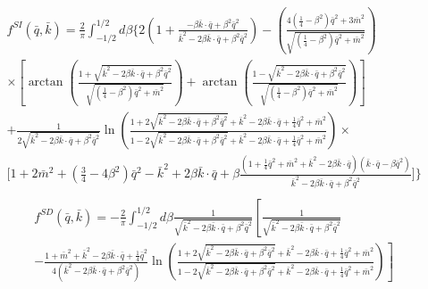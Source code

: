 \documentclass[12pt,letterpaper]{book}
\begin{document}
\begin{equation}
\begin{split}
&f^{SI}(\bar{q},\bar{k})=\frac{2}{\pi}\int_{-1/2}^{1/2}d\beta\Bigg\{2\left(1+\frac{-\beta\bar{k}\cdot\bar{q}+\beta^2\bar{q}^2}{\bar{k}^2-2\beta\bar{k}\cdot\bar{q}+\beta^2\bar{q}^2}\right)-\left(\frac{4(\frac{1}{4}-\beta^2)\bar{q}^2+3\bar{m}^2}{\sqrt{(\frac{1}{4}-\beta^2)\bar{q}^2+\bar{m}^2}}\right)\\
&\times\left[\arctan\left(\frac{1+\sqrt{\bar{k}^2-2\beta\bar{k}\cdot\bar{q}+\beta^2\bar{q}^2}}{\sqrt{(\frac{1}{4}-\beta^2)\bar{q}^2+\bar{m}^2}}\right)+\arctan\left(\frac{1-\sqrt{\bar{k}^2-2\beta\bar{k}\cdot\bar{q}+\beta^2\bar{q}^2}}{\sqrt{(\frac{1}{4}-\beta^2)\bar{q}^2+\bar{m}^2}}\right)\right]\\
&+\frac{1}{2\sqrt{\bar{k}^2-2\beta\bar{k}\cdot\bar{q}+\beta^2\bar{q}^2}}\ln\left(\frac{1+2\sqrt{\bar{k}^2-2\beta\bar{k}\cdot\bar{q}+\beta^2\bar{q}^2}+\bar{k}^2-2\beta\bar{k}\cdot\bar{q}+\frac{1}{4}\bar{q}^2+\bar{m}^2}{1-2\sqrt{\bar{k}^2-2\beta\bar{k}\cdot\bar{q}+\beta^2\bar{q}^2}+\bar{k}^2-2\beta\bar{k}\cdot\bar{q}+\frac{1}{4}\bar{q}^2+\bar{m}^2}\right)\times\\
&\Bigg[1+2\bar{m}^2+\left(\frac{3}{4}-4\beta^2\right)\bar{q}^2-\bar{k}^2+2\beta\bar{k}\cdot\bar{q}+\beta\frac{\left(1+\frac{1}{4}\bar{q}^2+\bar{m}^2+\bar{k}^2-2\beta\bar{k}\cdot\bar{q}\right)\left(\bar{k}\cdot\bar{q}-\beta\bar{q}^2\right)}{\bar{k}^2-2\beta\bar{k}\cdot\bar{q}+\beta^2\bar{q}^2}\Bigg]\Bigg\}\\
\end{split}
\end{equation}
\begin{equation}
\begin{split}
&f^{SD}(\bar{q},\bar{k})=-\frac{2}{\pi}\int_{-1/2}^{1/2}d\beta\frac{1}{\sqrt{\bar{k}^2-2\beta\bar{k}\cdot\bar{q}+\beta^2\bar{q}^2}}\left[\frac{1}{\sqrt{\bar{k}^2-2\beta\bar{k}\cdot\bar{q}+\beta^2\bar{q}^2}}\right.\\
&\left.-\frac{1+\bar{m}^2+\bar{k}^2-2\beta\bar{k}\cdot\bar{q}+\frac{1}{4}\bar{q}^2}{4\left(\bar{k}^2-2\beta\bar{k}\cdot\bar{q}+\beta^2\bar{q}^2\right)}\ln\left(\frac{1+2\sqrt{\bar{k}^2-2\beta\bar{k}\cdot\bar{q}+\beta^2\bar{q}^2}+\bar{k}^2-2\beta\bar{k}\cdot\bar{q}+\frac{1}{4}\bar{q}^2+\bar{m}^2}{1-2\sqrt{\bar{k}^2-2\beta\bar{k}\cdot\bar{q}+\beta^2\bar{q}^2}+\bar{k}^2-2\beta\bar{k}\cdot\bar{q}+\frac{1}{4}\bar{q}^2+\bar{m}^2}\right)\right]
\end{split}
\end{equation}
\end{document}
